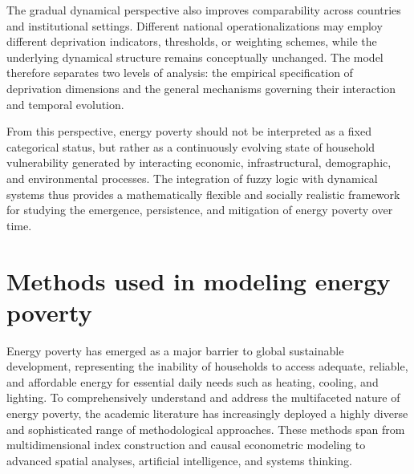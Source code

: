 \documentclass[11pt,a4paper]{article}
\begin{document}
The gradual dynamical perspective also improves comparability across countries and institutional settings. Different national operationalizations may employ different deprivation indicators, thresholds, or weighting schemes, while the underlying dynamical structure remains conceptually unchanged. The model therefore separates two levels of analysis: the empirical specification of deprivation dimensions and the general mechanisms governing their interaction and temporal evolution.

From this perspective, energy poverty should not be interpreted as a fixed categorical status, but rather as a continuously evolving state of household vulnerability generated by interacting economic, infrastructural, demographic, and environmental processes. The integration of fuzzy logic with dynamical systems thus provides a mathematically flexible and socially realistic framework for studying the emergence, persistence, and mitigation of energy poverty over time.
\section{Methods used in modeling energy poverty}

Energy poverty has emerged as a major barrier to global sustainable development, representing the inability of households to access adequate, reliable, and affordable energy for essential daily needs such as heating, cooling, and lighting. To comprehensively understand and address the multifaceted nature of energy poverty, the academic literature has increasingly deployed a highly diverse and sophisticated range of methodological approaches. These methods span from multidimensional index construction and causal econometric modeling to advanced spatial analyses, artificial intelligence, and systems thinking.


\end{document}
